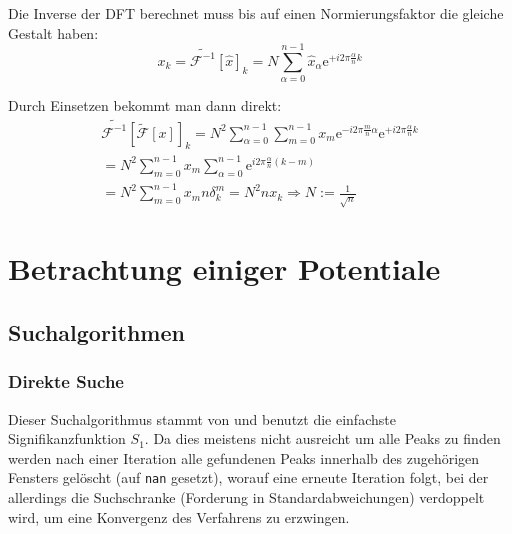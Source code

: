 \documentclass[10pt,a4paper,german]{scrartcl}
\begin{document}
		Die Inverse der DFT berechnet muss bis auf einen Normierungsfaktor die gleiche
		Gestalt haben:
		\begin{equation}
		\label{eq:idft}
			x_k
			= \tilde{\mathcal{F}^{-1}}[\hat{x}]_k
			= N \sum_{\alpha=0}^{n-1} \hat{x}_\alpha \mathrm{e}^{+ i 2\pi \frac{\alpha}{n} k}
		\end{equation}

		Durch Einsetzen bekommt man dann direkt:
		\begin{multline*}
			\tilde{\mathcal{F}^{-1}}[\tilde{\mathcal{F}}[x]]_k
			= N^2 \sum_{\alpha=0}^{n-1}
				\sum_{m=0}^{n-1} x_m \mathrm{e}^{- i 2\pi \frac{m}{n} \alpha}
		 	\mathrm{e}^{+ i 2\pi \frac{\alpha}{n} k} \\
		 	= N^2 \sum_{m=0}^{n-1} x_m
		 	  \sum_{\alpha=0}^{n-1}	\mathrm{e}^{i 2\pi \frac{\alpha}{n}(k-m)}\\
		 	= N^2 \sum_{m=0}^{n-1} x_m
		 	  n \delta^m_k
		 	= N^2 n x_k \Rightarrow N := \frac{1}{\sqrt{n}}
		\end{multline*}

  \section{Betrachtung einiger Potentiale}
  	\subsection{Suchalgorithmen}
  	  \subsubsection*{Direkte Suche}
  			Dieser Suchalgorithmus stammt von \cite{SAPS} und benutzt die
  			einfachste Signifikanzfunktion $S_1$. Da dies meistens nicht ausreicht um
  			alle Peaks zu finden werden nach einer Iteration alle gefundenen Peaks
	  		innerhalb des zugehörigen Fensters gelöscht (auf \verb!nan! gesetzt), 
  			worauf eine erneute Iteration folgt, bei der allerdings die Suchschranke 
	  		(Forderung in Standardabweichungen)
		  	verdoppelt wird, um eine Konvergenz des Verfahrens zu erzwingen.
			
\end{document}
